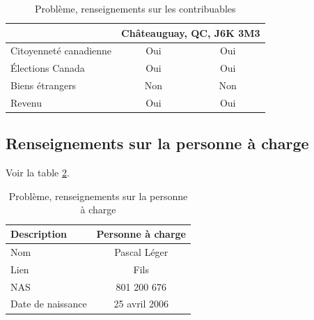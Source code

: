 \begin{table}
\begin{tabular}{|l|c|c|}
		& \multicolumn{2}{c|}{Châteauguay, QC, J6K 3M3} \\ \hline
		Citoyenneté canadienne                   &      Oui       &             Oui              \\ \hline
		Élections Canada                         &      Oui       &             Oui              \\ \hline
		Biens étrangers                          &      Non       &             Non              \\ \hline
		Revenu                                   &      Oui       &             Oui              \\ \hline
	\end{tabular}
	\caption[]{Problème, renseignements sur les contribuables}
	\label{table:chapitre6ProblemeRenseignementsContribuables}
\end{table}


\subsection{Renseignements sur la personne à charge}
Voir la table \ref{table:chapitre6ProblemeRenseignementsPersonneACharge}.
\begin{table}
	\centering
	\begin{tabular}{|l|c|}
		\hline
		\rowcolor{LightGreen} Description & Personne à charge \\ \hline
		Nom                               &   Pascal Léger    \\ \hline
		Lien                              &       Fils        \\ \hline
		NAS                               &    801 200 676    \\ \hline
		Date de naissance                 &   25 avril 2006   \\ \hline
	\end{tabular}
	\caption[]{Problème, renseignements sur la personne à charge}
	\label{table:chapitre6ProblemeRenseignementsPersonneACharge}
\end{table}


